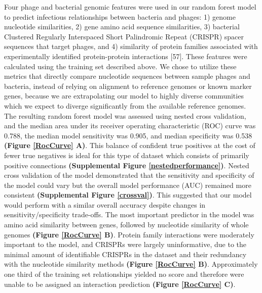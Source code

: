 \documentclass[12pt,]{article}
\begin{document}
Four phage and bacterial genomic features were used in our random forest
model to predict infectious relationships between bacteria and phages:
1) genome nucleotide similarities, 2) gene amino acid sequence
similarities, 3) bacterial Clustered Regularly Interspaced Short
Palindromic Repeat (CRISPR) spacer sequences that target phages, and 4)
similarity of protein families associated with experimentally identified
protein-protein interactions {[}57{]}. These features were calculated
using the training set described above. We chose to utilize these
metrics that directly compare nucleotide sequences between sample phages
and bacteria, instead of relying on alignment to reference genomes or
known marker genes, because we are extrapolating our model to highly
diverse communities which we expect to diverge significantly from the
available reference genomes. The resulting random forest model was
assessed using nested cross validation, and the median area under its
receiver operating characteristic (ROC) curve was 0.788, the median
model sensitivity was 0.905, and median specificity was 0.538
\textbf{(Figure \ref{RocCurve} A)}. This balance of confident true
positives at the cost of fewer true negatives is ideal for this type of
dataset which consists of primarily positive connections
\textbf{(Supplemental Figure \ref{nestedperformance})}. Nested cross
validation of the model demonstrated that the sensitivity and
specificity of the model could vary but the overall model performance
(AUC) remained more consistent \textbf{(Supplemental Figure
\ref{crossval})}. This suggested that our model would perform with a
similar overall accuracy despite changes in sensitivity/specificity
trade-offs. The most important predictor in the model was amino acid
similarity between genes, followed by nucleotide similarity of whole
genomes \textbf{(Figure \ref{RocCurve} B)}. Protein family interactions
were moderately important to the model, and CRISPRs were largely
uninformative, due to the minimal amount of identifiable CRISPRs in the
dataset and their redundancy with the nucleotide similarity methods
\textbf{(Figure \ref{RocCurve} B)}. Approximately one third of the
training set relationships yielded no score and therefore were unable to
be assigned an interaction prediction \textbf{(Figure \ref{RocCurve}
C)}.
\end{document}
